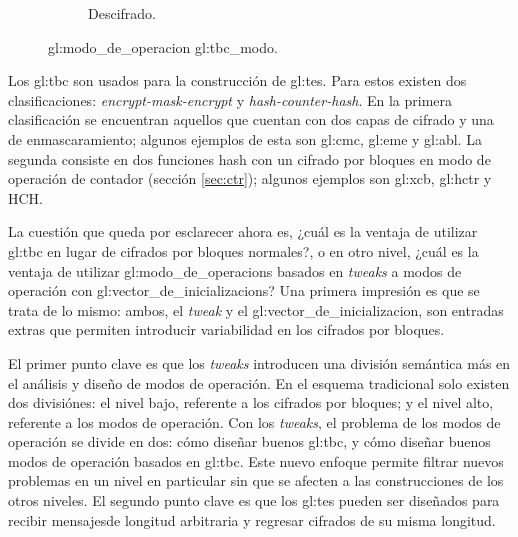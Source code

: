 \begin{figure}[H]
\begin{subfigure}{0.45\textwidth}
\begin{center}
      \caption{Descifrado.}
    \end{center}
  \end{subfigure}
  \caption{\Gls{gl:modo_de_operacion} \gls{gl:tbc_modo}.}
  \label{figura:tbc}
\end{figure}

Los \gls{gl:tbc} son usados para la construcción de \gls{gl:tes}. Para estos
existen dos clasificaciones: \textit{encrypt-mask-encrypt} y
\textit{hash-counter-hash}. En la primera clasificación se encuentran aquellos
que cuentan con dos capas de cifrado y una de enmascaramiento; algunos ejemplos
de esta son \gls{gl:cmc}, \gls{gl:eme} y \gls{gl:abl}. La segunda consiste en
dos funciones hash con un cifrado por bloques en modo de operación de contador
(sección \ref{sec:ctr}); algunos ejemplos son \gls{gl:xcb}, \gls{gl:hctr}
y HCH.


La cuestión que queda por esclarecer ahora es, ¿cuál es la ventaja de utilizar
\gls{gl:tbc} en lugar de cifrados por bloques normales?, o en otro nivel,
¿cuál es la ventaja de utilizar \glspl{gl:modo_de_operacion} basados en
\textit{tweaks} a modos de operación con \glspl{gl:vector_de_inicializacion}?
Una primera impresión es que se trata de lo mismo: ambos, el \textit{tweak} y
el \gls{gl:vector_de_inicializacion}, son entradas extras que permiten
introducir variabilidad en los cifrados por bloques.

El primer punto clave es que los \textit{tweaks} introducen una división
semántica más en el análisis y diseño de modos de operación. En el esquema
tradicional solo existen dos divisiónes: el nivel bajo, referente a los
cifrados por bloques; y el nivel alto, referente a los modos de operación. Con
los \textit{tweaks}, el problema de los modos de operación se divide en dos:
cómo diseñar buenos \gls{gl:tbc}, y cómo diseñar buenos modos de operación
basados en \gls{gl:tbc}. Este nuevo enfoque permite filtrar nuevos problemas
en un nivel en particular sin que se afecten a las construcciones de los otros
niveles. El segundo punto clave es que los \gls{gl:tes} pueden ser diseñados
para recibir mensajesde longitud arbitraria y regresar cifrados de su misma
longitud.
